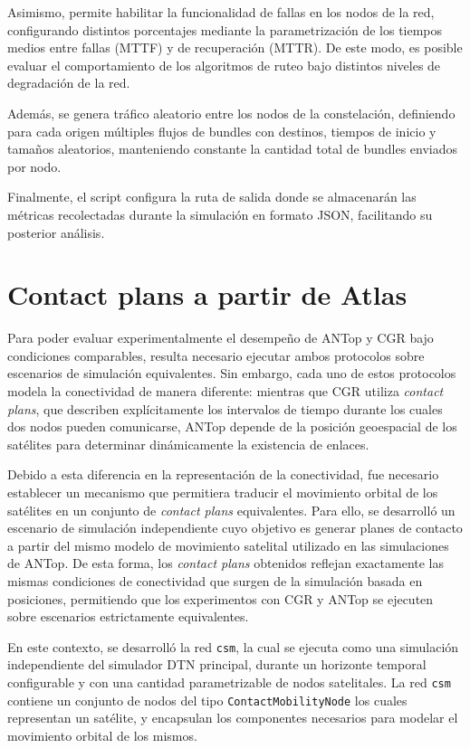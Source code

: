 Asimismo, permite habilitar la funcionalidad de fallas en los nodos de la red, configurando distintos porcentajes mediante la parametrización de los tiempos medios entre fallas (MTTF) y de recuperación (MTTR). De este modo, es posible evaluar el comportamiento de los algoritmos de ruteo bajo distintos niveles de degradación de la red.

Además, se genera tráfico aleatorio entre los nodos de la constelación, definiendo para cada origen múltiples flujos de bundles con destinos, tiempos de inicio y tamaños aleatorios, manteniendo constante la cantidad total de bundles enviados por nodo.

Finalmente, el script configura la ruta de salida donde se almacenarán las métricas recolectadas durante la simulación en formato JSON, facilitando su posterior análisis.

\section{Contact plans a partir de Atlas}

Para poder evaluar experimentalmente el desempeño de ANTop y CGR bajo condiciones comparables, resulta necesario ejecutar ambos protocolos sobre escenarios de simulación equivalentes. Sin embargo, cada uno de estos protocolos modela la conectividad de manera diferente: mientras que CGR utiliza \emph{contact plans}, que describen explícitamente los intervalos de tiempo durante los cuales dos nodos pueden comunicarse, ANTop depende de la posición geoespacial de los satélites para determinar dinámicamente la existencia de enlaces.

Debido a esta diferencia en la representación de la conectividad, fue necesario establecer un mecanismo que permitiera traducir el movimiento orbital de los satélites en un conjunto de \emph{contact plans} equivalentes. Para ello, se desarrolló un escenario de simulación independiente cuyo objetivo es generar planes de contacto a partir del mismo modelo de movimiento satelital utilizado en las simulaciones de ANTop. De esta forma, los \emph{contact plans} obtenidos reflejan exactamente las mismas condiciones de conectividad que surgen de la simulación basada en posiciones, permitiendo que los experimentos con CGR y ANTop se ejecuten sobre escenarios estrictamente equivalentes.

En este contexto, se desarrolló la red \texttt{csm}, la cual se ejecuta como una simulación independiente del simulador DTN principal, durante un horizonte temporal configurable y con una cantidad parametrizable de nodos satelitales. La red \texttt{csm} contiene un conjunto de nodos del tipo \texttt{ContactMobilityNode} los cuales representan un satélite, y encapsulan los componentes necesarios para modelar el movimiento orbital de los mismos.

